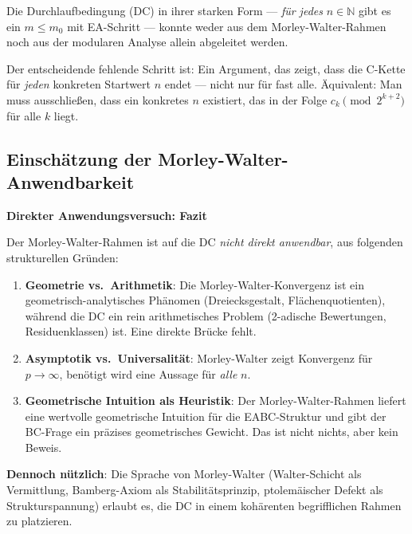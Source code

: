 \documentclass[12pt,a4paper]{article}
\newcommand{\N}{\mathbb{N}}
\begin{document}
\begin{tcolorbox}[warnung, title={Was bleibt offen}]
Die Durchlaufbedingung (DC) in ihrer starken Form ---
\emph{für jedes} $n \in \N$ gibt es ein $m \leq m_0$ mit EA-Schritt ---
konnte weder aus dem Morley-Walter-Rahmen noch aus der
modularen Analyse allein abgeleitet werden.

Der entscheidende fehlende Schritt ist:
Ein Argument, das zeigt, dass die C-Kette für \emph{jeden} konkreten
Startwert $n$ endet --- nicht nur für fast alle.
Äquivalent: Man muss ausschließen, dass ein konkretes $n$ existiert,
das in der Folge $c_k \pmod{2^{k+2}}$ für alle $k$ liegt.
\end{tcolorbox}

\subsection{Einschätzung der Morley-Walter-Anwendbarkeit}

\begin{tcolorbox}[morley]
\textbf{Direkter Anwendungsversuch: Fazit}

Der Morley-Walter-Rahmen ist auf die DC \emph{nicht direkt anwendbar},
aus folgenden strukturellen Gründen:
\begin{enumerate}[label=(\alph*)]
  \item \textbf{Geometrie vs.\ Arithmetik}: Die Morley-Walter-Konvergenz
    ist ein geometrisch-analytisches Phänomen (Dreiecksgestalt,
    Flächenquotienten), während die DC ein rein arithmetisches Problem
    (2-adische Bewertungen, Residuenklassen) ist. Eine direkte Brücke
    fehlt.

  \item \textbf{Asymptotik vs.\ Universalität}: Morley-Walter zeigt
    Konvergenz für $p \to \infty$, benötigt wird eine Aussage
    für \emph{alle} $n$.

  \item \textbf{Geometrische Intuition als Heuristik}: Der Morley-Walter-Rahmen
    liefert eine wertvolle geometrische Intuition für die EABC-Struktur
    und gibt der BC-Frage ein präzises geometrisches Gewicht.
    Das ist nicht nichts, aber kein Beweis.
\end{enumerate}

\textbf{Dennoch nützlich}: Die Sprache von Morley-Walter
(Walter-Schicht als Vermittlung, Bamberg-Axiom als Stabilitätsprinzip,
ptolemäischer Defekt als Strukturspannung) erlaubt es, die DC
in einem kohärenten begrifflichen Rahmen zu platzieren.
\end{tcolorbox}
\end{document}

